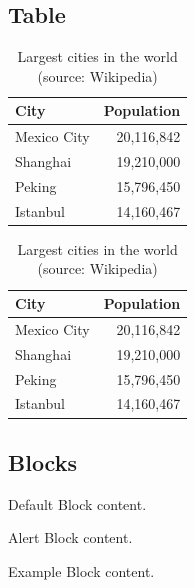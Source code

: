 \subsection{Table}
\begin{frame}
    \begin{table}
        \caption{Largest cities in the world (source: Wikipedia)}
        \begin{tabular}{@{} lr @{}}
          \toprule
          City & Population\\
          \midrule
          Mexico City & 20,116,842\\
          Shanghai & 19,210,000\\
          Peking & 15,796,450\\
          Istanbul & 14,160,467\\
          \bottomrule
        \end{tabular}
        \hspace*{1cm}
            \setlength\extrarowheight{3pt}
        \begin{tabular}{|lr|}
          \hline
          \rowcolor{primary}\color{white}City & \color{white}Population\\
          \hline
          Mexico City & 20,116,842\\
          Shanghai & 19,210,000\\
          Peking & 15,796,450\\
          Istanbul & 14,160,467\\
          \hline
        \end{tabular}
    \end{table}
\end{frame}

\subsection{Blocks}
\begin{frame}

   \centering
	\begin{minipage}[b]{0.5\textwidth}

	  \begin{block}{Default}
        Block content.
      \end{block}

      \begin{alertblock}{Alert}
        Block content.
      \end{alertblock}

      \begin{exampleblock}{Example}
        Block content.
      \end{exampleblock}      
      
	\end{minipage}	
\end{frame}

